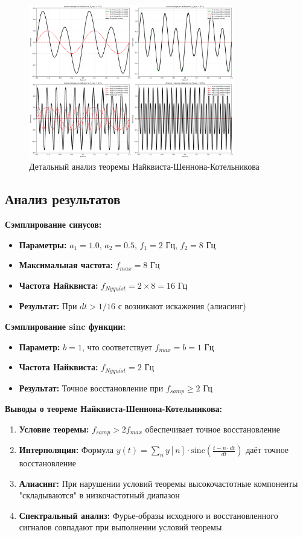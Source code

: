 \begin{figure}[H]
    \centering
    \includegraphics[width=0.8\textwidth]{images/task2/nyquist_analysis.png}
    \caption{Детальный анализ теоремы Найквиста-Шеннона-Котельникова}
    \label{fig:nyquist_analysis}
\end{figure}

\subsection*{Анализ результатов}

\textbf{Сэмплирование синусов:}
\begin{itemize}
    \item \textbf{Параметры:} $a_1 = 1.0$, $a_2 = 0.5$, $f_1 = 2$ Гц, $f_2 = 8$ Гц
    \item \textbf{Максимальная частота:} $f_{max} = 8$ Гц
    \item \textbf{Частота Найквиста:} $f_{Nyquist} = 2 \times 8 = 16$ Гц
    \item \textbf{Результат:} При $dt > 1/16$ с возникают искажения (алиасинг)
\end{itemize}

\textbf{Сэмплирование sinc функции:}
\begin{itemize}
    \item \textbf{Параметр:} $b = 1$, что соответствует $f_{max} = b = 1$ Гц
    \item \textbf{Частота Найквиста:} $f_{Nyquist} = 2$ Гц
    \item \textbf{Результат:} Точное восстановление при $f_{samp} \geq 2$ Гц
\end{itemize}

\textbf{Выводы о теореме Найквиста-Шеннона-Котельникова:}
\begin{enumerate}
    \item \textbf{Условие теоремы:} $f_{samp} > 2f_{max}$ обеспечивает точное восстановление
    \item \textbf{Интерполяция:} Формула $y(t) = \sum_n y[n] \cdot \text{sinc}\left(\frac{t - n \cdot dt}{dt}\right)$ даёт точное восстановление
    \item \textbf{Алиасинг:} При нарушении условий теоремы высокочастотные компоненты "складываются" в низкочастотный диапазон
    \item \textbf{Спектральный анализ:} Фурье-образы исходного и восстановленного сигналов совпадают при выполнении условий теоремы
\end{enumerate}

